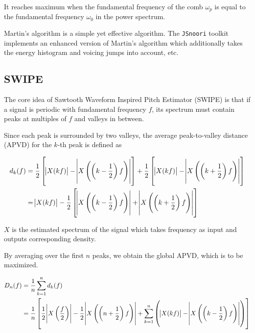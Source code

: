 \documentclass[11pt,a4paper]{report}
\begin{document}
It reaches maximum when the fundamental frequency of the comb \(\omega_p\) is equal to the fundamental frequency \(\omega_0\) in the power spectrum.

Martin's algorithm is a simple yet effective algorithm.
The \texttt{JSnoori} toolkit implements an enhanced version of Martin's algorithm which additionally takes the energy histogram and voicing jumps into account, etc.

\subsection{SWIPE}

The core idea of Sawtooth Waveform Inspired Pitch Estimator (SWIPE) is that if a signal is periodic with fundamental frequency \(f\), its spectrum must contain peaks at multiples of \(f\)  and valleys in between.

Since each peak is surrounded by two valleys, the average peak-to-valley distance (APVD) for the \(k\)-th peak is defined as

\begin{equation}
  \begin{split}
    d_k(f) & = \frac{1}{2} \left[ \abs{X(kf)} - \abs{X \left( \left(k - \frac{1}{2}\right) f \right)} \right] + \frac{1}{2} \left[ \abs{X(kf)} - \abs{X \left( \left(k + \frac{1}{2} \right) f \right)} \right] \\
      & = \abs{X(kf)} - \frac{1}{2} \left[ \abs{X \left( \left(k - \frac{1}{2}\right) f \right)} + \abs{X \left( \left(k + \frac{1}{2}\right) f \right)} \right]
  \end{split}
\end{equation}

\(X\) is the estimated spectrum of the signal which takes frequency as input and outputs corresponding density.

By averaging over the first \(n\) peaks, we obtain the global APVD, which is to be maximized.

\begin{equation}
  \begin{split}
    D_n(f) & = \frac{1}{n} \sum_{k=1}^{n} d_k(f) \\
      & = \frac{1}{n} \left[ \frac{1}{2} \abs{X \left( \frac{f}{2} \right)} - \frac{1}{2} \abs{X \left( \left(n + \frac{1}{2}\right) f \right)} + \sum_{k=1}^{n} \left( \abs{X(kf)} - \abs{X \left( \left(k - \frac{1}{2}\right) f \right)} \right) \right]
  \end{split}
\end{equation}
\end{document}
